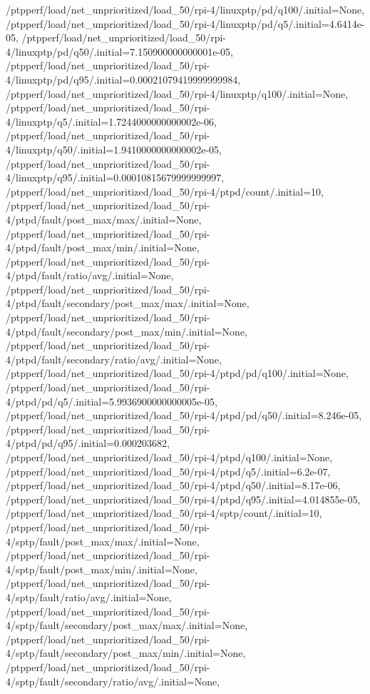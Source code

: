 {    /ptpperf/load/net_unprioritized/load_50/rpi-4/linuxptp/pd/q100/.initial=None,
    /ptpperf/load/net_unprioritized/load_50/rpi-4/linuxptp/pd/q5/.initial=4.6414e-05,
    /ptpperf/load/net_unprioritized/load_50/rpi-4/linuxptp/pd/q50/.initial=7.150900000000001e-05,
    /ptpperf/load/net_unprioritized/load_50/rpi-4/linuxptp/pd/q95/.initial=0.00021079419999999984,
    /ptpperf/load/net_unprioritized/load_50/rpi-4/linuxptp/q100/.initial=None,
    /ptpperf/load/net_unprioritized/load_50/rpi-4/linuxptp/q5/.initial=1.7244000000000002e-06,
    /ptpperf/load/net_unprioritized/load_50/rpi-4/linuxptp/q50/.initial=1.9410000000000002e-05,
    /ptpperf/load/net_unprioritized/load_50/rpi-4/linuxptp/q95/.initial=0.00010815679999999997,
    /ptpperf/load/net_unprioritized/load_50/rpi-4/ptpd/count/.initial=10,
    /ptpperf/load/net_unprioritized/load_50/rpi-4/ptpd/fault/post_max/max/.initial=None,
    /ptpperf/load/net_unprioritized/load_50/rpi-4/ptpd/fault/post_max/min/.initial=None,
    /ptpperf/load/net_unprioritized/load_50/rpi-4/ptpd/fault/ratio/avg/.initial=None,
    /ptpperf/load/net_unprioritized/load_50/rpi-4/ptpd/fault/secondary/post_max/max/.initial=None,
    /ptpperf/load/net_unprioritized/load_50/rpi-4/ptpd/fault/secondary/post_max/min/.initial=None,
    /ptpperf/load/net_unprioritized/load_50/rpi-4/ptpd/fault/secondary/ratio/avg/.initial=None,
    /ptpperf/load/net_unprioritized/load_50/rpi-4/ptpd/pd/q100/.initial=None,
    /ptpperf/load/net_unprioritized/load_50/rpi-4/ptpd/pd/q5/.initial=5.9936900000000005e-05,
    /ptpperf/load/net_unprioritized/load_50/rpi-4/ptpd/pd/q50/.initial=8.246e-05,
    /ptpperf/load/net_unprioritized/load_50/rpi-4/ptpd/pd/q95/.initial=0.000203682,
    /ptpperf/load/net_unprioritized/load_50/rpi-4/ptpd/q100/.initial=None,
    /ptpperf/load/net_unprioritized/load_50/rpi-4/ptpd/q5/.initial=6.2e-07,
    /ptpperf/load/net_unprioritized/load_50/rpi-4/ptpd/q50/.initial=8.17e-06,
    /ptpperf/load/net_unprioritized/load_50/rpi-4/ptpd/q95/.initial=4.014855e-05,
    /ptpperf/load/net_unprioritized/load_50/rpi-4/sptp/count/.initial=10,
    /ptpperf/load/net_unprioritized/load_50/rpi-4/sptp/fault/post_max/max/.initial=None,
    /ptpperf/load/net_unprioritized/load_50/rpi-4/sptp/fault/post_max/min/.initial=None,
    /ptpperf/load/net_unprioritized/load_50/rpi-4/sptp/fault/ratio/avg/.initial=None,
    /ptpperf/load/net_unprioritized/load_50/rpi-4/sptp/fault/secondary/post_max/max/.initial=None,
    /ptpperf/load/net_unprioritized/load_50/rpi-4/sptp/fault/secondary/post_max/min/.initial=None,
    /ptpperf/load/net_unprioritized/load_50/rpi-4/sptp/fault/secondary/ratio/avg/.initial=None,
}
